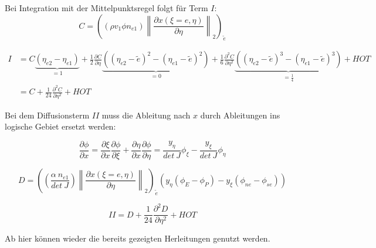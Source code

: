 \documentclass[11pt, ngerman,colorback,accentcolor=tud2d]{tudreport}
\newcommand{\pder}[2][]{\frac{\partial#1}{\partial#2}}
\newcommand{\yxi}{y_{\xi}}
\newcommand{\yeta}{y_{\eta}}
\newcommand{\etai}{\eta_{e1}}
\newcommand{\etaii}{\eta_{e2}}
\newcommand{\etilde}{\tilde{e}}
\begin{document}
Bei Integration mit der Mittelpunktsregel folgt für Term $I$:
\begin{equation*}
  C=\left({(\rho v_1 \phi n_{e1})
  \left\lVert \frac{\partial x(\xi=e, \eta)}{\partial \eta} \right\rVert_2}\right)_{\tilde{e}}
\end{equation*}

\begin{align*}
  I&= C \underbrace{(\etaii-\etai)}_{=1} + \frac{1}{2} \pder[C]{\eta}
  \underbrace{\left({(\etaii-\etilde)^2-(\etai-\etilde)^2}\right)}_{=0}
  +\frac{1}{6} \frac{\partial^2 C}{\partial \eta^2}
  \underbrace{\left({(\etaii-\etilde)^3-(\etai-\etilde)^3}\right)}_{=\frac{1}{4}} + HOT\\
  &= C + \frac{1}{24}  \frac{\partial^2 C}{\partial \eta^2}+HOT
\end{align*}

Bei dem Diffusionsterm $II$ muss die Ableitung nach $x$ durch Ableitungen ins logische
Gebiet ersetzt werden:

\begin{equation}
  \pder[\phi]{x}=\pder[\xi]{x}\pder[\phi]{\xi}+\pder[\eta]{x}\pder[\phi]{\eta}
  = \frac{\yeta}{det\ J} \phi_{\xi} - \frac{\yxi}{det\ J} \phi_{\eta}
\end{equation}

\begin{equation}
  D =\left({(\frac{\alpha\ n_{e1}}{det\ J})
  \left\lVert \frac{\partial x(\xi=e, \eta)}{\partial \eta} \right\rVert_2 }\right)_{\etilde}
  \left({\yeta(\phi_{E}-\phi_P) - \yxi(\phi_{ne}-\phi_{se})}\right)
\end{equation}

\begin{equation*}
  II=D+\frac{1}{24}  \frac{\partial^2 D}{\partial \eta^2}+HOT
\end{equation*}


Ab hier können wieder die bereits gezeigten Herleitungen genutzt werden.
\end{document}
